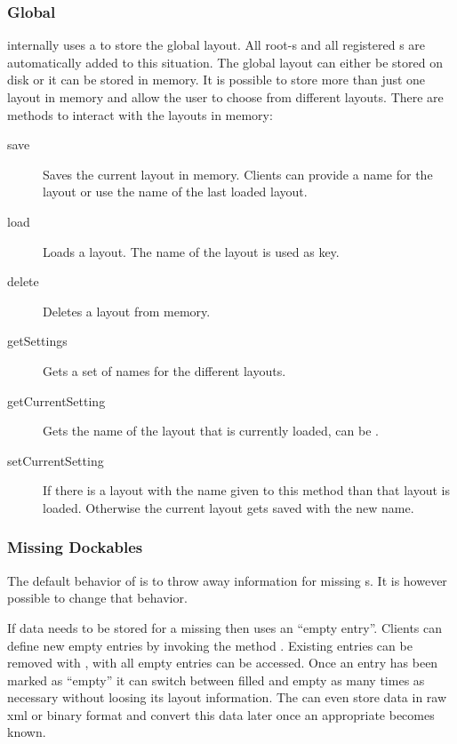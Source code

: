 \subsubsection{Global}
 internally uses a  to store the global layout. All root-s and all registered s are automatically added to this situation. The global layout can either be stored on disk or it can be stored in memory. It is possible to store more than just one layout in memory and allow the user to choose from different layouts. There are methods to interact with the layouts in memory:

\begin{description}
 \item[save] Saves the current layout in memory. Clients can provide a name for the layout or use the name of the last loaded layout.
 \item[load] Loads a layout. The name of the layout is used as key.
 \item[delete] Deletes a layout from memory.
 \item[getSettings] Gets a set of names for the different layouts.
 \item[getCurrentSetting] Gets the name of the layout that is currently loaded, can be .
 \item[setCurrentSetting] If there is a layout with the name given to this method than that layout is loaded. Otherwise the current layout gets saved with the new name.
\end{description}

\subsubsection{Missing Dockables}
The default behavior of  is to throw away information for missing s. It is however possible to change that behavior.

If data needs to be stored for a missing  then  uses an ``empty entry''. Clients can define new empty entries by invoking the method . Existing entries can be removed with , with  all empty entries can be accessed. Once an entry has been marked as ``empty'' it can switch between filled and empty as many times as necessary without loosing its layout information. The  can even store data in raw xml or binary format and convert this data later once an appropriate  becomes known.

